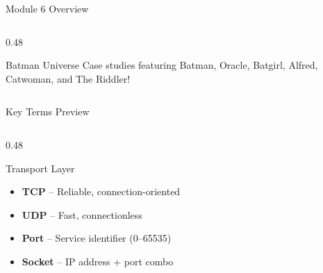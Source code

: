 \documentclass[aspectratio=169, 11pt]{beamer}
\newcommand{\keyterm}[1]{\textbf{\textcolor{rctcblue}{#1}}}
\begin{document}
\begin{frame}{Module 6 Overview}
\begin{columns}[T]
\begin{column}{0.48\textwidth}
            \vspace{0.2em}
            \begin{exampleblock}{Batman Universe}
                \small
                Case studies featuring Batman, Oracle, Batgirl, Alfred, Catwoman, and The Riddler!
            \end{exampleblock}
        \end{column}
    \end{columns}
\end{frame}

\begin{frame}{Key Terms Preview}
    \small
    \begin{columns}[T]
        \begin{column}{0.48\textwidth}
            \begin{block}{Transport Layer}
                \begin{itemize}\setlength{\itemsep}{1pt}
                    \item \keyterm{TCP} -- Reliable, connection-oriented
                    \item \keyterm{UDP} -- Fast, connectionless
                    \item \keyterm{Port} -- Service identifier (0--65535)
                    \item \keyterm{Socket} -- IP address + port combo
                \end{itemize}
            \end{block}
            

\end{column}
\end{columns}
\end{frame}
\end{document}
